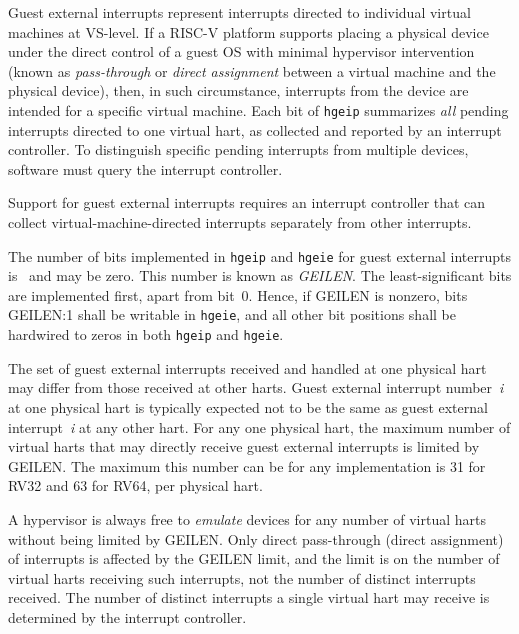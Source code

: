 Guest external interrupts represent interrupts directed to individual
virtual machines at VS-level.
If a RISC-V platform supports placing a physical device under the direct
control of a guest OS with minimal hypervisor intervention (known as
\emph{pass-through} or \emph{direct assignment} between a virtual machine
and the physical device), then, in such circumstance, interrupts from the
device are intended for a specific virtual machine.
Each bit of {\tt hgeip} summarizes \emph{all} pending interrupts directed
to one virtual hart, as collected and reported by an interrupt
controller.
To distinguish specific pending interrupts from multiple devices,
software must query the interrupt controller.

\begin{commentary}
Support for guest external interrupts requires an interrupt controller
that can collect virtual-machine-directed interrupts separately from
other interrupts.
\end{commentary}

The number of bits implemented in {\tt hgeip} and {\tt hgeie} for guest
external interrupts is \unspecified\ and may be zero.
This number is known as \textit{GEILEN}.
The least-significant bits are implemented first, apart from bit~0.
Hence, if GEILEN is nonzero, bits GEILEN:1 shall be writable in
{\tt hgeie}, and all other bit positions shall be hardwired to zeros in
both {\tt hgeip} and {\tt hgeie}.

\begin{commentary}
The set of guest external interrupts received and handled at one physical
hart may differ from those received at other harts.
Guest external interrupt number~\textit{i} at one physical hart is
typically expected not to be the same as guest external
interrupt~\textit{i} at any other hart.
For any one physical hart, the maximum number of virtual harts that may
directly receive guest external interrupts is limited by GEILEN.
The maximum this number can be for any implementation is 31 for RV32 and
63 for RV64, per physical hart.

A hypervisor is always free to \emph{emulate} devices for any number of
virtual harts without being limited by GEILEN.
Only direct pass-through (direct assignment) of interrupts is affected by
the GEILEN limit, and the limit is on the number of virtual harts
receiving such interrupts, not the number of distinct interrupts
received.
The number of distinct interrupts a single virtual hart may receive is
determined by the interrupt controller.
\end{commentary}

